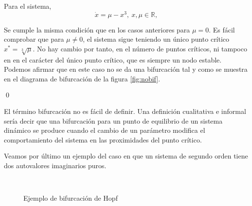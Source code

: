 \begin{example}[No bifurcación] Para el sistema,
\begin{equation*}
\dot x = \mu - x^3,\  x, \mu \in \mathbb{R},  
\end{equation*}

Se cumple la misma condición que en los casos anteriores para $\mu=0$. Es fácil comprobar que para $\mu \neq 0$, el sistema sigue teniendo un único punto crítico $x^*=\sqrt[3]{\mu}$. No hay cambio por tanto, en el número de puntos críticos, ni tampoco en en el carácter del único punto crítico, que es siempre un nodo estable.  Podemos afirmar que en este caso no se da una bifurcación tal y como se muestra en el diagrama de bifurcación de la figura \ref{fig:nobif}.

\qed
\end{example}

 El término bifurcación no es fácil de definir. Una definición cualitativa e informal sería decir que una bifurcación para un punto de equilibrio de un sistema dinámico se produce cuando el cambio de un parámetro modifica el comportamiento del sistema en las proximidades del punto crítico.
 
Veamos por último un ejemplo del caso en que un sistema de segundo orden tiene dos autovalores imaginarios puros.
\begin{figure}
\centering
{}\\
\caption{Ejemplo de bifurcación de Hopf}
\label{fig:hopf}
\end{figure}

